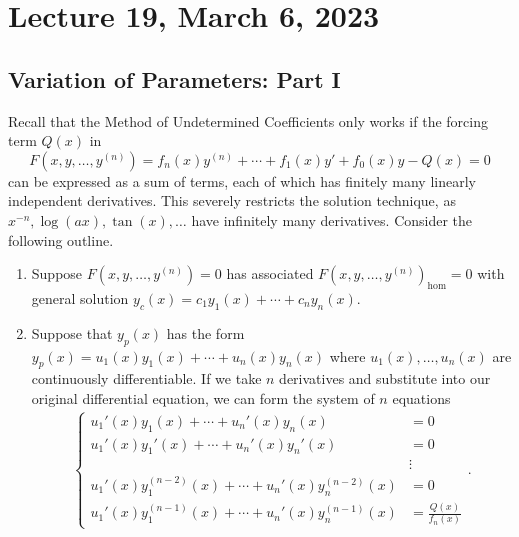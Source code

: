 \pagebreak

\section{Lecture 19, March 6, 2023}

    \subsection{Variation of Parameters: Part I}

        Recall that the Method of Undetermined Coefficients only works if the forcing term \(Q(x)\) in
        \begin{equation*}
            F(x,y,\ldots,y^{(n)})=f_n(x)y^{(n)}+\cdots+f_1(x)y'+f_0(x)y-Q(x)=0
        \end{equation*}
        can be expressed as a sum of terms, each of which has finitely many linearly independent derivatives. This severely restricts the solution technique, as \(x^{-n},\log(ax),\tan(x),\ldots\) have infinitely many derivatives. Consider the following outline.
        \begin{enumerate}
            \item Suppose \(F(x,y,\ldots,y^{(n)})=0\) has associated \(F(x,y,\ldots,y^{(n)})_{\text{hom}}=0\) with general solution \(y_c(x)=c_1y_1(x)+\cdots+c_ny_n(x)\).
            \item Suppose that \(y_p(x)\) has the form \(y_p(x)=u_1(x)y_1(x)+\cdots+u_n(x)y_n(x)\) where \(u_1(x),\ldots,u_n(x)\) are continuously differentiable. If we take \(n\) derivatives and substitute into our original differential equation, we can form the system of \(n\) equations
            \begin{align*}
                \begin{cases}
                    u_1'(x)y_1(x)+\cdots+u_n'(x)y_n(x)&=0 \\
                    u_1'(x)y_1'(x)+\cdots+u_n'(x)y_n'(x)&=0 \\
                    &\vdots \\
                    u_1'(x)y_1^{(n-2)}(x)+\cdots+u_n'(x)y_n^{(n-2)}(x)&=0 \\
                    u_1'(x)y_1^{(n-1)}(x)+\cdots+u_n'(x)y_n^{(n-1)}(x)&=\frac{Q(x)}{f_n(x)}
                \end{cases}.
            \end{align*}
        \end{enumerate}
        \vphantom
        \\
